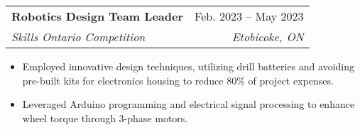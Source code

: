 \documentclass[letterpaper]{article}
\makeatletter
\newcommand{\resumeItem}[1]{
  \item\small{
    {#1 \vspace{-2pt}}
  }
}
\newcommand{\resumeSubheading}[4]{
  \vspace{-2pt}\item
    \begin{tabular*}{0.97\textwidth}[t]{l@{\extracolsep{\fill}}r}
      \textbf{#1} & #2 \\
      \textit{\small#3} & \textit{\small #4} \\
    \end{tabular*}\vspace{-7pt}
}
\newcommand{\resumeItemListStart}{\begin{itemize}}
\newcommand{\resumeItemListEnd}{\end{itemize}\vspace{-5pt}}
\makeatother
\begin{document}
    \resumeSubheading
      {Robotics Design Team Leader}{Feb. 2023 -- May 2023}
      {Skills Ontario Competition}{Etobicoke, ON}
      \resumeItemListStart
        \resumeItem{Employed innovative design techniques, utilizing drill batteries and avoiding pre-built kits for electronics housing to reduce 80\% of project expenses.}
        \resumeItem{Leveraged Arduino programming and electrical signal processing to enhance wheel torque through 3-phase motors.}
    \resumeItemListEnd



\end{document}
